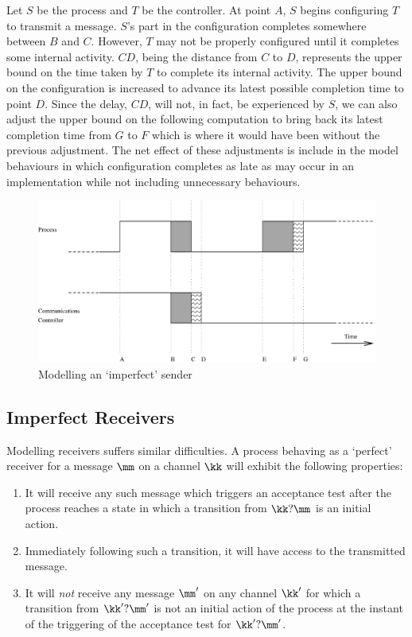 Let $S$ be the process and $T$ be the controller. At point $A$, $S$
begins configuring $T$ to transmit a message. $S$'s part in the configuration
completes somewhere between $B$ and $C$. However, $T$ may not
be properly configured until it completes some internal activity. 
$CD$, being the distance from $C$ to $D$, represents the upper bound on 
the time taken by $T$ to complete its internal activity. The upper bound 
on the configuration is increased to advance its latest possible
completion time to point $D$. Since the delay, $CD$, will not, in fact, be
experienced by $S$, we can also adjust the upper bound on the following
computation to bring back its latest completion time from $G$ to $F$
which is where it would have been without the previous adjustment. The net
effect of these adjustments is include in the model behaviours in 
which configuration completes as late as may occur in an implementation
while not including unnecessary behaviours. 

\begin{figure}
\begin{center}
\includegraphics[width=.75\linewidth]{PRACTICE/impsnd.eps}
\end{center}
\caption{Modelling an `imperfect' sender\label{fig:impsnd}}
\end{figure}


\subsection{Imperfect Receivers}
Modelling receivers suffers similar difficulties. A process behaving as
a `perfect' receiver for a message $\mm$ on a channel $\kk$ will 
exhibit the following properties:
\begin{enumerate}
\item It will receive 
any such message which triggers an acceptance test after the process reaches
a state in which a transition from $\kk?\mm$ is an initial action.
\item
Immediately following such a transition, it will have access to the 
transmitted message.
\item
It will {\em not\/} receive any message $\mm'$ on any channel $\kk'$ 
for which a transition from $\kk'?\mm'$ is not
an initial action of the process at the instant of the triggering of the
acceptance test for $\kk'?\mm'$.
\end{enumerate}       


